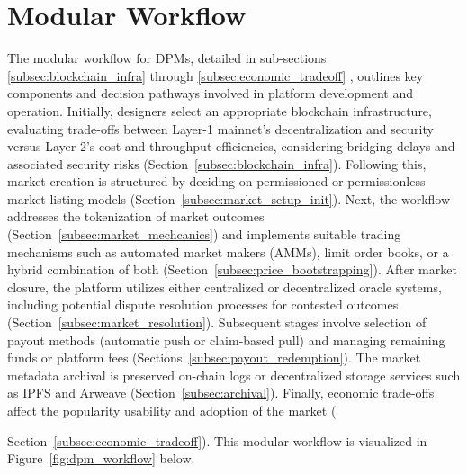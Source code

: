 \section{Modular Workflow}
The modular workflow for DPMs, detailed in sub-sections \ref{subsec:blockchain_infra} through \ref{subsec:economic_tradeoff} , outlines key components and decision pathways involved in platform development and operation. Initially, designers select an appropriate blockchain infrastructure, evaluating trade-offs between Layer-1 mainnet's decentralization and security versus Layer-2's cost and throughput efficiencies, considering bridging delays and associated security risks (Section~\ref{subsec:blockchain_infra}). Following this, market creation is structured by deciding on permissioned or permissionless market listing models (Section~\ref{subsec:market_setup_init}). Next, the workflow addresses the tokenization of market outcomes (Section~\ref{subsec:market_mechcanics}) and implements suitable trading mechanisms such as automated market makers (AMMs), limit order books, or a hybrid combination of both (Section~\ref{subsec:price_bootstrapping}). After market closure, the platform utilizes either centralized or decentralized oracle systems, including potential dispute resolution processes for contested outcomes (Section~\ref{subsec:market_resolution}). Subsequent stages involve selection of payout methods (automatic push or claim-based pull) and managing remaining funds or platform fees (Sections~\ref{subsec:payout_redemption}). The market metadata archival is preserved on-chain logs or decentralized storage services such as IPFS and Arweave (Section~\ref{subsec:archival}). Finally, economic trade-offs affect the popularity usability and adoption of the market ({Section~\ref{subsec:economic_tradeoff}). This modular workflow is visualized in Figure~\ref{fig:dpm_workflow} below.

}
